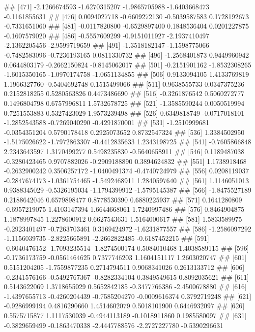 \documentclass[
]{article}
\begin{document}
\begin{enumerate}[label=(\alph*)]
##  [471] -2.1266674593 -1.6270315207 -1.9865705988 -1.6403668473 -0.1161855631
##  [476]  0.0094027718 -0.6609272130 -0.5039587583  0.1728192673 -0.7331651060
##  [481] -0.0117820800 -0.6529897400  0.1848536404  0.0201227875 -0.1607579020
##  [486] -0.5557609299 -0.9151011927 -2.1937410497 -2.1362205456 -2.9599719659
##  [491] -1.3518182147 -1.1598775066 -0.7482583096 -0.7236193165  0.0811330732
##  [496] -1.2568401873  0.9449960942  0.0644803179 -0.2662150824 -0.8145062017
##  [501] -0.2151901162 -1.8532308265 -1.6015350165 -1.0970174758 -1.0651134855
##  [506]  0.9133094105  1.4133769819  1.1966327760 -0.5404692748  0.1515499066
##  [511]  0.9638555733  0.0347375236  0.2152818255  0.5280563826  0.4473486690
##  [516] -0.3261876542  0.5060272777  0.1496804798  0.6757996811  1.5732678725
##  [521] -1.3585590244  0.0050519994  0.7251553883  0.5327423029  1.9573239498
##  [526]  0.6349818749 -0.0717018101 -1.2852543588 -0.7269040290 -0.4291870001
##  [531] -1.2510999681 -0.0354351204  0.5790178418  0.2925073652  0.8732547324
##  [536]  1.3384502950 -1.5175026622 -1.7972863307 -0.4412835633  1.2343198725
##  [541] -0.7605866848  2.2343643597  1.3170499277  0.5498235830 -0.5640658911
##  [546]  0.1189487038 -0.3280423465  0.9707882026 -0.2909188890  0.3894624832
##  [551]  1.1738918468 -0.2632900242  0.3506257172 -1.0400491374 -0.4740724979
##  [556]  0.0208119037 -0.2847674173 -1.0361754465 -1.5492468911  1.2840597640
##  [561]  1.1146051013  0.9388345029 -0.5326195034 -1.1794399912 -1.5795145387
##  [566] -1.8475527189  0.2188642046  0.6579898477  0.8778530390  0.6880225937
##  [571]  0.1641280809 -0.6957219075  1.4103147394  1.6644668061  1.7240997486
##  [576]  0.8464904875  1.1878997845  1.2278600912  0.6627543631  1.5164000617
##  [581]  1.5833589975 -0.2923401497 -0.7263703461  0.3169424972 -1.6231877557
##  [586] -1.2586097292 -1.1156039735 -2.8225665891 -2.2662822485 -0.6187452215
##  [591] -0.6040476152 -1.7093235514 -1.8274500174  0.5084010468  1.4038589115
##  [596] -0.1736173759 -0.0561464625  0.7377746203  1.1604151117  1.2603020747
##  [601]  0.5151204205 -1.7559877235  0.2714794511  0.9068341026  0.2613133712
##  [606] -0.2341576166 -0.5492767367 -0.8282334104  0.3849549615  0.8092035621
##  [611]  0.5143622069  1.3718655029  0.5652842185 -0.3477766386 -2.4500678880
##  [616] -1.4397655713 -0.4260204439 -0.7585204270 -0.0009616374  0.3792719248
##  [621] -0.9286999194  0.4816290660  1.4514602079  0.5018101900  0.6446932097
##  [626]  0.5575715877  1.1117530039 -0.4944113189 -0.1018911860  0.1985580097
##  [631] -0.3829659499 -0.1863470338 -2.4447788576 -2.2727227780 -0.5390296631

\end{enumerate}
\end{document}
